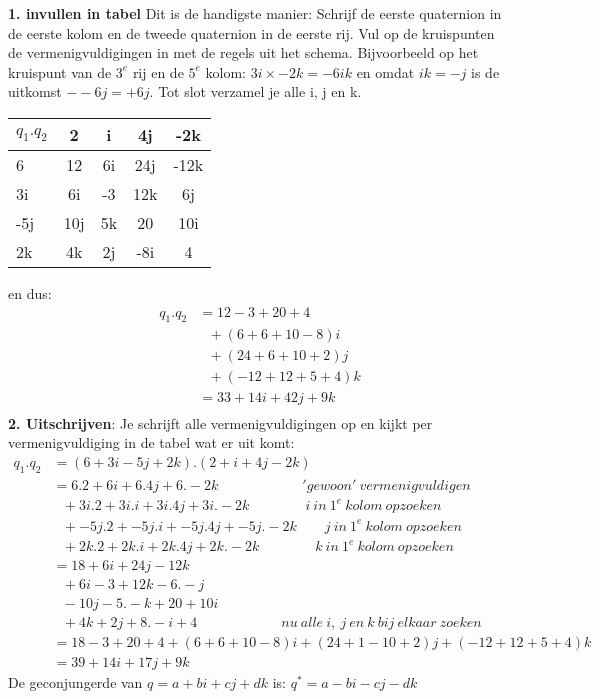 \textbf{1. invullen in tabel} Dit is de handigste manier:  Schrijf de eerste quaternion in de eerste kolom en de tweede quaternion in de eerste rij. Vul op de kruispunten de 
vermenigvuldigingen in met de  regels uit het schema. Bijvoorbeeld op het kruispunt van de $ 3^e $ rij en de $   5^e $ kolom: $  3i\times -2k = -6ik   $ en omdat $ ik = -j $ is de uitkomst $ --6j = +6j $. Tot slot verzamel je  alle i, j en k.
\begin{center}
	\begin{tabular}{ | l || c | c |c |c |}
		\hline
		$ q_1.q_2 $& 2 & i & 4j & -2k \\ \hline \hline
		6 & 12 & 6i & 24j & -12k  \\ \hline
		3i & 6i & -3 & 12k & 6j\\ \hline
		-5j & 10j &  5k & 20 & 10i\\ \hline
		2k & 4k & 2j & -8i & 4\\ 
		\hline 
	\end{tabular}
\end{center}
en dus:
\begin{align*}
q_1.q_2 & = 12 - 3 + 20 + 4 \\
& \ \ \ +(6 + 6 + 10 - 8)i \\
& \ \ \ +(24 + 6 +10 +2)j \\
& \ \ \ +(-12 + 12 + 5 +4 )k \\
& = 33 +14i +42j +9k \\
\end{align*}
\textbf{2. Uitschrijven}: Je schrijft alle vermenigvuldigingen op en kijkt per vermenigvuldiging in de tabel wat er uit komt:
\begin{align*}
q_1.q_2 & = (6 + 3i - 5j + 2k) . (2 + i + 4j - 2k) \\
& =   6.2 + 6i + 6.4j + 6.-2k \qquad  \qquad \qquad  'gewoon' \  vermenigvuldigen\\
& \ \ \ + 3i.2 + 3i.i + 3i.4j + 3i.-2k \qquad \qquad  i\  in \ 1^e \  kolom  \ opzoeken\\
& \ \ \ + -5j.2 + -5j.i + -5j.4j + -5j.-2k \qquad j \  in \ 1^e \ kolom \ opzoeken\\
& \ \ \ + 2k.2 + 2k.i + 2k.4j + 2k.-2k \qquad \qquad k \  in \ 1^e \ kolom \ opzoeken\\
& = 18 + 6i + 24j - 12k \\
& \ \ \ + 6i - 3 + 12k -6.-j \\
& \ \ \ -10j - 5.-k + 20 +10i \\
& \ \ \  + 4k + 2j + 8.-i + 4 \qquad \qquad \qquad   nu \ alle \ i, \ j \ en \ k\ bij \ elkaar \  zoeken \\
& = 18 - 3 + 20 + 4 + (6+6 + 10 -8)i + (24 + 1 - 10 + 2)j + (-12 + 12 + 5 + 4)k \\
&  = 39 + 14i +17j +9k
\end{align*}
{De geconjungerde van $ q = a +bi + cj + dk $  is: 
	\quad	$ q^* = a - bi - cj - dk $ }\\ \\

